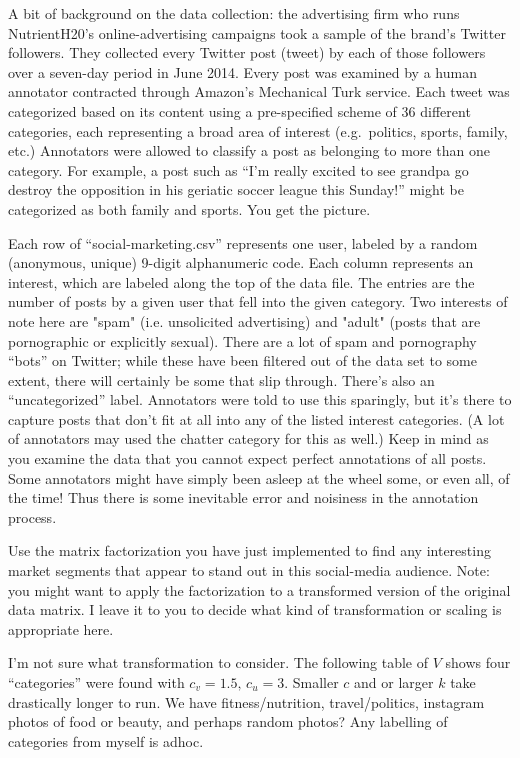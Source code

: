 \documentclass{article}
\begin{document}
A bit of background on the data collection: the advertising firm who runs NutrientH20's online-advertising campaigns took a sample of the brand's Twitter followers. They collected every Twitter post (tweet) by each of those followers over a seven-day period in June 2014. Every post was examined by a human annotator contracted through Amazon's Mechanical Turk service. Each tweet was categorized based on its content using a pre-specified scheme of 36 different categories, each representing a broad area of interest (e.g.~politics, sports, family, etc.) Annotators were allowed to classify a post as belonging to more than one category. For example, a post such as ``I'm really excited to see grandpa go destroy the opposition in his geriatic soccer league this Sunday!'' might be categorized as both family and sports. You get the picture.

Each row of ``social-marketing.csv'' represents one user, labeled by a random (anonymous, unique) 9-digit alphanumeric code. Each column represents an interest, which are labeled along the top of the data file. The entries are the number of posts by a given user that fell into the given category. Two interests of note here are "spam" (i.e. unsolicited advertising) and "adult" (posts that are pornographic or explicitly sexual). There are a lot of spam and pornography ``bots'' on Twitter; while these have been filtered out of the data set to some extent, there will certainly be some that slip through. There's also an ``uncategorized'' label. Annotators were told to use this sparingly, but it's there to capture posts that don't fit at all into any of the listed interest categories. (A lot of annotators may used the chatter category for this as well.) Keep in mind as you examine the data that you cannot expect perfect annotations of all posts. Some annotators might have simply been asleep at the wheel some, or even all, of the time! Thus there is some inevitable error and noisiness in the annotation process.

Use the matrix factorization you have just implemented to find any interesting market segments that appear to stand out in this social-media audience.  Note: you might want to apply the factorization to a transformed version of the original data matrix.  I leave it to you to decide what kind of transformation or scaling is appropriate here.


\color{blue}
I'm not sure what transformation to consider. The following table of $V$ shows four ``categories'' were found with $c_v = 1.5, \, c_u=3$.  Smaller $c$ and or larger $k$ take drastically longer to run. We have fitness/nutrition, travel/politics, instagram photos of food or beauty, and perhaps random photos? Any labelling of categories from myself is adhoc. 
\end{document}
